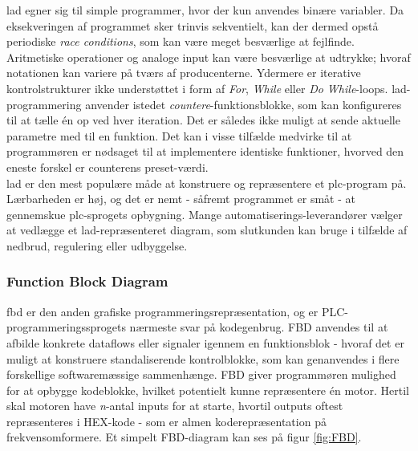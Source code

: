 \noindent \gls{lad} egner sig til simple programmer, hvor der kun anvendes binære variabler. Da eksekveringen af programmet sker trinvis sekventielt, kan der dermed opstå periodiske \textit{race conditions}, som kan være meget besværlige at fejlfinde. Aritmetiske operationer og analoge input kan være besværlige at udtrykke; hvoraf notationen kan variere på tværs af producenterne. Ydermere er iterative kontrolstrukturer ikke understøttet i form af \textit{For}, \textit{While} eller \textit{Do While}-loops. \gls{lad}-programmering anvender istedet \textit{countere}-funktionsblokke, som kan konfigureres til at tælle én op ved hver iteration. Det er således ikke muligt at sende aktuelle parametre med til en funktion. Det kan i visse tilfælde medvirke til at programmøren er nødsaget til at implementere identiske funktioner, hvorved den eneste forskel er counterens preset-værdi. \\

\noindent \gls{lad} er den mest populære måde at konstruere og repræsentere et \gls{plc}-program på. Lærbarheden er høj, og det er nemt - såfremt programmet er småt - at gennemskue \gls{plc}-sprogets opbygning. Mange automatiserings-leverandører vælger at vedlægge et \gls{lad}-repræsenteret diagram, som slutkunden kan bruge i tilfælde af nedbrud, regulering eller udbyggelse. \cite{FDB_desc}

\subsubsection{Function Block Diagram}
\gls{fbd} er den anden grafiske programmeringsrepræsentation, og er PLC-programmeringssprogets nærmeste svar på kodegenbrug. FBD anvendes til at afbilde konkrete dataflows eller signaler igennem en funktionsblok - hvoraf det er muligt at konstruere standaliserende kontrolblokke, som kan genanvendes i flere forskellige softwaremæssige sammenhænge. FBD giver programmøren mulighed for at opbygge kodeblokke, hvilket potentielt kunne repræsentere én motor. Hertil skal motoren have \textit{n}-antal inputs for at starte, hvortil outputs oftest repræsenteres i HEX-kode - som er almen koderepræsentation på frekvensomformere. Et simpelt FBD-diagram kan ses på figur \ref{fig:FBD}.

